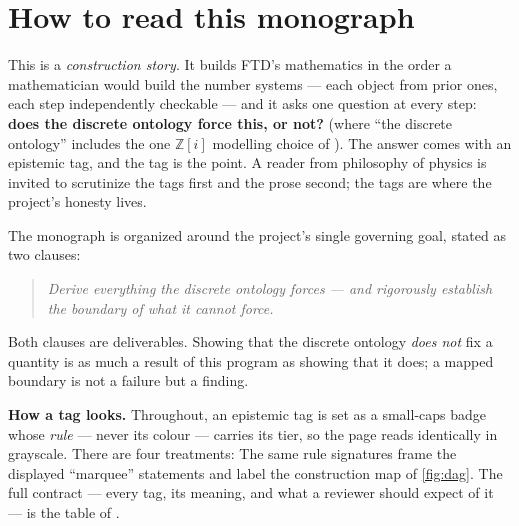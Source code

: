 \section*{How to read this monograph}
\noindent This is a \emph{construction story}. It builds FTD's mathematics in
the order a mathematician would build the number systems --- each object from
prior ones, each step independently checkable --- and it asks one question at
every step: \textbf{does the discrete ontology force this, or not?} (where
``the discrete ontology'' includes the one $\mathbb{Z}[i]$ modelling choice of
). The answer comes with an epistemic tag, and the tag is the
point. A reader from philosophy of physics is invited to scrutinize the tags
first and the prose second; the tags are where the project's honesty lives.

\medskip
\noindent The monograph is organized around the project's single governing
goal, stated as two clauses:
\begin{quote}\itshape
  Derive everything the discrete ontology forces --- and rigorously establish
  the boundary of what it cannot force.
\end{quote}
\noindent Both clauses are deliverables. Showing that the discrete ontology
\emph{does not} fix a quantity is as much a result of this program as showing
that it does; a mapped boundary is not a failure but a finding.

\medskip
\noindent\textbf{How a tag looks.} Throughout, an epistemic tag is set as a
small-caps badge whose \emph{rule} --- never its colour --- carries its tier,
so the page reads identically in grayscale. There are four treatments:
\noindent The same rule signatures frame the displayed ``marquee'' statements
and label the construction map of \cref{fig:dag}. The full contract --- every
tag, its meaning, and what a reviewer should expect of it --- is the table of
.

\cleardoublepage
\tableofcontents*
